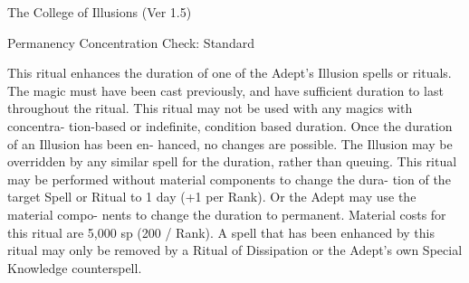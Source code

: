\begin{Chapter}{The College of Illusions (Ver 1.5)}
\begin{ritual}[R-3]{Permanency }
Concentration Check: Standard 
\begin{effects}
This ritual enhances the duration of one of 
the  Adept’s  Illusion  spells  or  rituals.  The  magic 
must have been cast previously, and have sufficient 
duration  to  last  throughout  the  ritual.  This  ritual 
may  not  be  used  with  any  magics  with  concentra-
tion-based  or  indefinite,  condition  based  duration. 
Once  the  duration  of  an  Illusion  has  been  en-
hanced, no changes are possible. The  Illusion may 
be overridden by any similar spell for the duration, 
rather  than  queuing.  This  ritual  may  be  performed 
without  material  components  to  change  the  dura-
tion  of  the  target  Spell  or  Ritual  to  1  day  (+1  per 
Rank). Or the Adept may use the material compo-
nents to change the duration to permanent. Material 
costs  for  this  ritual  are  5,000  sp  (200  /  Rank).  A 
spell  that  has  been  enhanced  by  this  ritual  may 
only  be  removed  by  a  Ritual  of  Dissipation  or  the 
Adept’s own Special Knowledge counterspell. 
\end{effects}
\end{ritual}
\end{Chapter}
